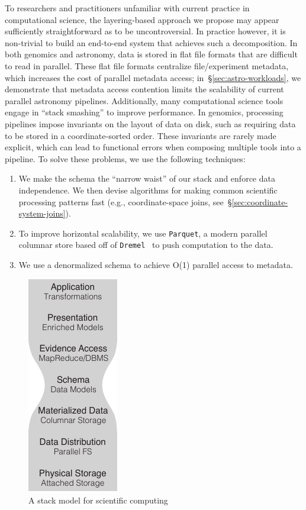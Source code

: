 \documentclass{acm_proc_article-sp}
\begin{document}
To researchers and practitioners unfamiliar with current practice in computational science, the layering-based approach
we propose may appear sufficiently straightforward as to be uncontroversial. In practice however, it is non-trivial to build
an end-to-end system that achieves such a decomposition. In both genomics and astronomy, data is stored in flat file
formats that are difficult to read in parallel. These flat file formats centralize file/experiment metadata,
which increases the cost of parallel metadata access; in~\S\ref{sec:astro-workloads}, we demonstrate that metadata
access contention limits the scalability of current parallel astronomy pipelines. Additionally, many computational science
tools engage in ``stack smashing'' to improve performance. In genomics, processing \linebreak pipelines impose
invariants on the layout of data on disk, such as requiring data to be stored in a coordinate-sorted order. These
invariants are rarely made explicit, which can lead to functional errors when composing multiple tools into a pipeline. To
solve these problems, we use the following techniques:

\begin{enumerate}
\item We make the schema the ``narrow waist'' of our stack and enforce data independence. We then
devise algorithms for making common scientific processing patterns fast (e.g., coordinate-space joins,
see~\S\ref{sec:coordinate-system-joins}).
\item To improve horizontal scalability, we use \texttt{Parquet}, a modern parallel columnar store based off of
\texttt{Dremel}~\cite{melnik10} to push computation to the data.
\item We use a denormalized schema to achieve O(1) parallel access to metadata.
\end{enumerate}

\begin{figure}[h]
\begin{center}
\includegraphics{stack-model-2.pdf}
\end{center}
\caption{A stack model for scientific computing}
\label{fig:stack-model}
\end{figure}
\end{document}
